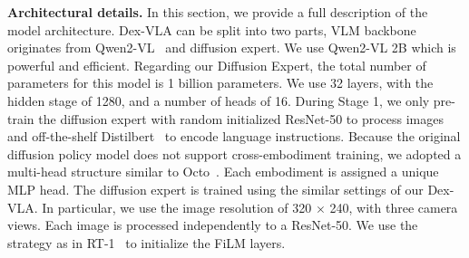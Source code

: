 \begin{appendix}
\textbf{Architectural details.} In this section, we provide a full description of the model architecture. Dex-VLA can be split into two parts, VLM backbone originates from Qwen2-VL~\cite{wang2024qwen2} and diffusion expert. We use Qwen2-VL 2B which is powerful and efficient. Regarding our Diffusion Expert, the total number of parameters for this model is 1 billion parameters. We use 32 layers, with the hidden stage of 1280, and a number of heads of 16. During Stage 1, we only pre-train the diffusion expert with random initialized ResNet-50 to process images and off-the-shelf Distilbert~\cite{sanh2019distilbert} to encode language instructions. Because the original diffusion policy model does not support cross-embodiment training, we adopted a multi-head structure similar to Octo~\cite{octo}. Each embodiment is assigned a unique MLP head. The diffusion expert is trained using the similar settings of our Dex-VLA. In particular, we use the image resolution of 320 $\times$ 240, with three camera views. Each image is processed independently to a ResNet-50. We use the strategy as in RT-1~\cite{brohan2022rt-1} to initialize the FiLM layers. 





\end{appendix}